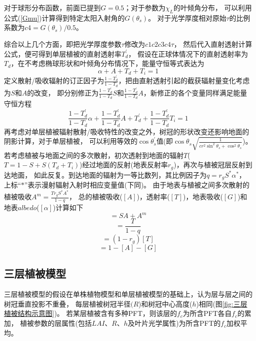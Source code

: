 对于球形分布函数，前面已提到$G=0.5$；对于参数为$\chi_L$的叶倾角分布，
可以利用公式(\ref{Gmu})计算得到特定太阳入射角的$G\left(\theta_s\right)$。
对于光学厚度相对原始$\tau$的比例系数为$c4=G\left(\theta_s\right)/0.5$。


综合以上几个方面，即把光学厚度参数$\tau$修改为$c1c2c3c4\tau$，
然后代入直射透射计算公式，便可得到单层植被的直射透射率$T_d^\prime$，
假设在正球体情况下的直射透射率为$T_d$，在不考虑椭球形状和叶倾角分布情况下，能量守恒等式表达为
\begin{equation}
\alpha+A+T_{d}+T_{i}=1
\end{equation}
定义散射/吸收辐射的订正因子为$\frac{1-T_d^\prime}{1-T_d}$，把由直射透射引起的截获辐射量变化考虑为$S$和$A$的改变，
即分别修正为$\frac{1-T_d^\prime}{1-T_d}S$和$\frac{1-T_d^\prime}{1-T_d}A$，新修正的各个变量同样满足能量守恒方程
\begin{equation}
\frac{1-T_{d}^{\prime}}{1-T_{d}} \alpha+\frac{1-T_{d}^{\prime}}{1-T_{d}} A+T_{d}^{\prime}+\frac{1-T_{d}^{\prime}}{1-T_{d}} T_{i}=1
\end{equation}
再考虑对单层植被辐射散射/吸收特性的改变之外，树冠的形状改变还影响地面的阴影计算，对于单层植被，
可以利用等效的$\cos{\theta_s^\prime}$值(即$\cos{\theta_s}\sqrt{\frac{1}{{cr}^2\sin^2{\theta_s}+\cos^2{\theta_s}}}$)。 
若考虑植被与地面之间的多次散射，初次透射到地面的辐射$T$($T=1-S+S\left(T_d+T_i\right)$)经过地面的反射(地表反射率$r_g$)，再次与植被冠层反射到达地面，
如此反复。到达地面的辐射为一等比数列，其比例因子为$q=r_gS^\ast\alpha^\ast$，上标“$\ast$”表示漫射辐射入射时相应变量值(下同)。
由于地表与植被之间多次散射的植被吸收$A^m=\frac{Tr_gS^\ast A^\ast}{1-q}$，
总的植被吸收($\left[A\right]$)，透射率($\left[T\right]$)，地表吸收($\left[G\right]$)和地表$albedo$($\left[\alpha\right]$)计算如下
\begin{equation}
[A]=S A+A^{m}
\end{equation}
\begin{equation}
[T]=\frac{T}{1-q}
\end{equation}
\begin{equation}
[G]=\left(1-r_{g}\right)[T]
\end{equation}
\begin{equation}
[\alpha]=1-[A]-[G]
\end{equation}
\subsection{三层植被模型}
三层植被模型的假设在单株植物模型和单层植被模型的基础上，认为层与层之间的树冠垂直投影不重叠，
每层植被树冠半径$(R$)和树冠中心高度($h$)相同(图\ref{fig:三层植被结构示意图})。
若某层植被含有多种PFT，则该层的$f_c$为所含PFT各自$f_c$的累加，
植被参数的层属性(包括$LAI$、$R$、$h$及叶片光学属性)为所含PFT的$f_c$加权平均。



